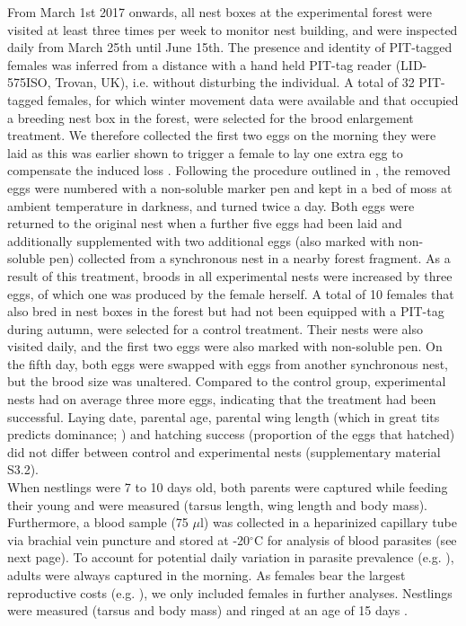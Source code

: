 \documentclass[10pt, twoside]{book} %
\begin{document}
From March 1st 2017 onwards, all nest boxes at the experimental forest were visited at least three times per week to monitor nest building, and were inspected daily from March 25th until June 15th. The presence and identity of PIT-tagged females was inferred from a distance with a hand held PIT-tag reader (LID-575ISO, Trovan, UK), i.e. without disturbing the individual. A total of 32 PIT-tagged females, for which winter movement data were available and that occupied a breeding nest box in the forest, were selected for the brood enlargement treatment. We therefore collected the first two eggs on the morning they were laid as this was earlier shown to trigger a female to lay one extra egg to compensate the induced loss \citep{Oppliger1996, Visser2001}. Following the procedure outlined in \citet{Visser2001}, the removed eggs were numbered with a non-soluble marker pen and kept in a bed of moss at ambient temperature in darkness, and turned twice a day. Both eggs were returned to the original nest when a further five eggs had been laid and additionally supplemented with two additional eggs (also marked with non-soluble pen) collected from a synchronous nest in a nearby forest fragment. As a result of this treatment, broods in all experimental nests were increased by three eggs, of which one was produced by the female herself. A total of 10 females that also bred in nest boxes in the forest but had not been equipped with a PIT-tag during autumn, were selected for a control treatment. Their nests were also visited daily, and the first two eggs were also marked with non-soluble pen. On the fifth day, both eggs were swapped with eggs from another synchronous nest, but the brood size was unaltered. Compared to the control group, experimental nests had on average three more eggs, indicating that the treatment had been successful. Laying date, parental age, parental wing length (which in great tits predicts dominance; \citealt{Sandell1991}) and hatching success (proportion of the eggs that hatched) did not differ between control and experimental nests (supplementary material S3.2).\\

When nestlings were 7 to 10 days old, both parents were captured while feeding their young and were measured (tarsus length, wing length and body mass). Furthermore, a blood sample (75 $\mu$l) was collected in a heparinized capillary tube via brachial vein puncture and stored at -20$^{\circ}$C for analysis of blood parasites (see next page). To account for potential daily variation in parasite prevalence (e.g. \citealt{VanHemert2019}), adults were always captured in the morning. As females bear the largest reproductive costs (e.g. \citealt{Visser2001}), we only included females in further analyses. Nestlings were measured (tarsus and body mass) and ringed at an age of 15 days \citep{Matthysen2011}. 
\end{document}
